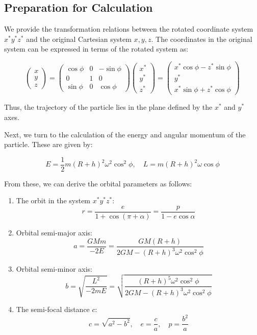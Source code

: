 \documentclass[11pt,en]{elegantpaper}
\begin{document}
\subsection{Preparation for Calculation}

We provide the transformation relations between the rotated coordinate system $x^{*}y^{*}z^{*}$ and the original Cartesian system $x, y, z$. The coordinates in the original system can be expressed in terms of the rotated system as:

\begin{equation}
    \begin{pmatrix} 
    x \\ 
    y \\ 
    z 
    \end{pmatrix} = 
    \begin{pmatrix}
        \cos\phi & 0 & -\sin\phi \\
        0 & 1 & 0 \\
        \sin\phi & 0 & \cos\phi
    \end{pmatrix}
    \begin{pmatrix} 
    x^{*} \\ 
    y^{*} \\ 
    z^{*} 
    \end{pmatrix}
    = \begin{pmatrix} 
    x^{*} \cos\phi - z^{*} \sin\phi \\
    y^{*} \\
    x^{*} \sin\phi + z^{*} \cos\phi
    \end{pmatrix}
\end{equation}

\vspace{2em}

Thus, the trajectory of the particle lies in the plane defined by the $x^{*}$ and $y^{*}$ axes.

\newpage

Next, we turn to the calculation of the energy and angular momentum of the particle. These are given by:

\begin{equation}
    E = \frac{1}{2} m (R + h)^{2} \omega^{2} \cos^{2} \phi, \quad
    L = m (R + h)^{2} \omega \cos \phi
\end{equation}

From these, we can derive the orbital parameters as follows:
\begin{enumerate}
    \item The orbit in the system $x^{*}y^{*}z^{*}$:
    \[
    r = \frac{e}{1 + \cos(\pi + \alpha)} = \frac{p}{1 - e \cos\alpha}
    \]
    \item Orbital semi-major axis:
    \[
    a = \frac{GMm}{-2E} = \frac{GM(R + h)}{2GM - (R + h)^3 \omega^2 \cos^2 \phi}
    \]
    \item Orbital semi-minor axis:
    \[
    b = \sqrt{\frac{L^2}{-2mE}} = \sqrt{\frac{(R + h)^5 \omega^2 \cos^2 \phi}{2GM - (R + h)^3 \omega^2 \cos^2 \phi}}
    \]
    \item The semi-focal distance $c$:
    \[
    c = \sqrt{a^2 - b^2}, \quad e = \frac{c}{a}, \quad p = \frac{b^2}{a}
    \]
\end{enumerate}
\end{document}
